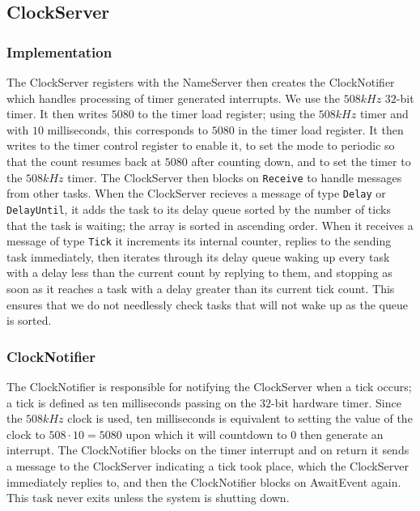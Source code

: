\documentclass[12pt]{article}
\begin{document}
\subsection{ClockServer}
\subsubsection{Implementation}
The ClockServer registers with the NameServer then creates the ClockNotifier which handles processing of timer generated interrupts.  We use the $508kHz$ $32$-bit timer.  It then writes $5080$ to the timer load register; using the $508kHz$ timer and with $10$ milliseconds, this corresponds to $5080$ in the timer load register.  It then writes to the timer control register to enable it, to set the mode to periodic so that the count resumes back at $5080$ after counting down, and to set the timer to the $508kHz$ timer.  The ClockServer then blocks on \texttt{Receive} to handle messages from other tasks.  When the ClockServer recieves a message of type \texttt{Delay} or \texttt{DelayUntil}, it adds the task to its delay queue sorted by the number of ticks that the task is waiting; the array is sorted in ascending order.  When it receives a message of type \texttt{Tick} it increments its internal counter, replies to the sending task immediately, then iterates through its delay queue waking up every task with a delay less than the current count by replying to them, and stopping as soon as it reaches a task with a delay greater than its current tick count.  This ensures that we do not needlessly check tasks that will not wake up as the queue is sorted.
\\
\subsubsection{ClockNotifier}
The ClockNotifier is responsible for notifying the ClockServer when a tick occurs; a tick is defined as ten milliseconds passing on the $32$-bit hardware timer.  Since the $508kHz$ clock is used, ten milliseconds is equivalent to setting the value of the clock to $508\cdot 10 = 5080$ upon which it will countdown to $0$ then generate an interrupt.  The ClockNotifier blocks on the timer interrupt and on return it sends a message to the ClockServer indicating a tick took place, which the ClockServer immediately replies to, and then the ClockNotifier blocks on AwaitEvent again.  This task never exits unless the system is shutting down.
\\
\end{document}

